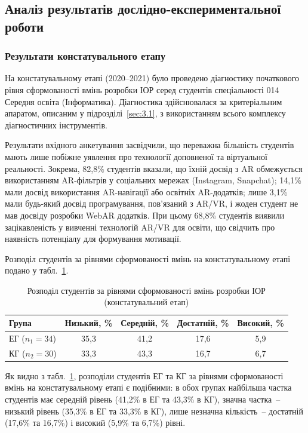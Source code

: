 \subsection{Аналіз результатів дослідно-експериментальної роботи}\label{sec:3.3}

\subsubsection{Результати констатувального етапу}

На констатувальному етапі (2020--2021) було проведено діагностику початкового рівня сформованості вмінь розробки ІОР серед студентів спеціальності 014 Середня освіта (Інформатика). Діагностика здійснювалася за критеріальним апаратом, описаним у підрозділі~\ref{sec:3.1}, з використанням всього комплексу діагностичних інструментів.

Результати вхідного анкетування засвідчили, що переважна більшість студентів мають лише побіжне уявлення про технології доповненої та віртуальної реальності. Зокрема, 82,8\% студентів вказали, що їхній досвід з AR обмежується використанням AR-фільтрів у соціальних мережах (Instagram, Snapchat); 14,1\% мали досвід використання AR-навігації або освітніх AR-додатків; лише 3,1\% мали будь-який досвід програмування, пов'язаний з AR/VR, і жоден студент не мав досвіду розробки WebAR додатків. При цьому 68,8\% студентів виявили зацікавленість у вивченні технологій AR/VR для освіти, що свідчить про наявність потенціалу для формування мотивації.

Розподіл студентів за рівнями сформованості вмінь на констатувальному етапі подано у табл.~\ref{tab:konst}.

\begin{table}[!h]
\caption{Розподіл студентів за рівнями сформованості вмінь розробки ІОР (констатувальний етап)}
\label{tab:konst}
\centering
\small
\begin{tabular}{|l|c|c|c|c|}
\hline
\hfill \textbf{Група} & \textbf{Низький, \%} & \textbf{Середній, \%} & \textbf{Достатній, \%} & \textbf{Високий, \%} \\
\hline
ЕГ ($n_1 = 34$) & 35,3 & 41,2 & 17,6 & 5,9 \\
\hline
КГ ($n_2 = 30$) & 33,3 & 43,3 & 16,7 & 6,7 \\
\hline
\end{tabular}
\end{table}

Як видно з табл.~\ref{tab:konst}, розподіли студентів ЕГ та КГ за рівнями сформованості вмінь на констатувальному етапі є подібними: в обох групах найбільша частка студентів має середній рівень (41,2\% в ЕГ та 43,3\% в КГ), значна частка~-- низький рівень (35,3\% в ЕГ та 33,3\% в КГ), лише незначна кількість~-- достатній (17,6\% та 16,7\%) і високий (5,9\% та 6,7\%) рівні.

